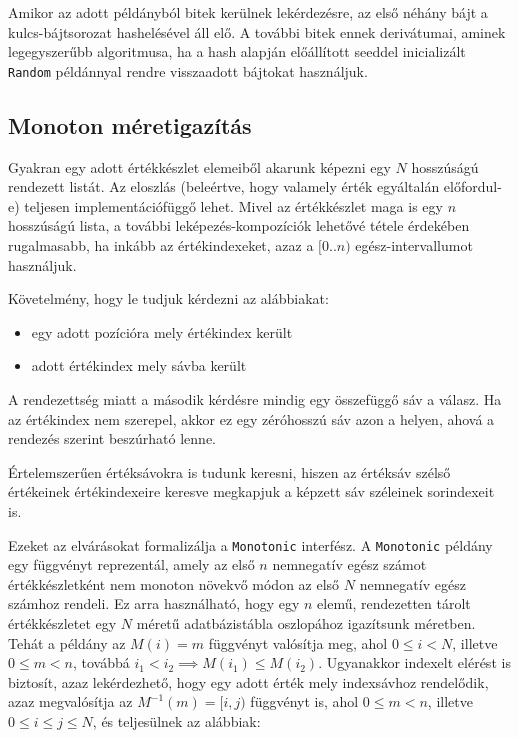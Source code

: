 \documentclass[
    parspace,
    noindent,
    nohyp,
]{elteiktdk}[2023/04/10]
\begin{document}
Amikor az adott példányból bitek kerülnek lekérdezésre,
az első néhány bájt a kulcs-bájtsorozat hashelésével áll elő.
A további bitek ennek derivátumai, aminek legegyszerűbb algoritmusa,
ha a hash alapján előállított seeddel inicializált \texttt{Random} példánnyal
rendre visszaadott bájtokat használjuk.

\subsection{Monoton méretigazítás}

Gyakran egy adott értékkészlet elemeiből akarunk képezni egy $N$ hosszúságú rendezett listát.
Az eloszlás (beleértve, hogy valamely érték egyáltalán előfordul-e)
teljesen implementációfüggő lehet.
Mivel az értékkészlet maga is egy $n$ hosszúságú lista,
a további leképezés-kompozíciók lehetővé tétele érdekében rugalmasabb,
ha inkább az értékindexeket, azaz a $[0..n)$ egész-intervallumot használjuk.

Követelmény, hogy le tudjuk kérdezni az alábbiakat:

\begin{itemize}
    \item egy adott pozícióra mely értékindex került
    \item adott értékindex mely sávba került
\end{itemize}

A rendezettség miatt a második kérdésre mindig egy összefüggő sáv a válasz. Ha az értékindex nem szerepel, akkor ez egy zéróhosszú sáv azon a helyen, ahová a rendezés szerint beszúrható lenne.

Értelemszerűen értéksávokra is tudunk keresni, hiszen az értéksáv szélső értékeinek értékindexeire keresve megkapjuk a képzett sáv széleinek sorindexeit is.

Ezeket az elvárásokat formalizálja a \texttt{Monotonic} interfész.
A \texttt{Monotonic} példány egy függvényt reprezentál,
amely az első $n$ nemnegatív egész számot értékkészletként nem monoton növekvő módon
az első $N$ nemnegatív egész számhoz rendeli.
Ez arra használható, hogy egy $n$ elemű, rendezetten tárolt értékkészletet
egy $N$ méretű adatbázistábla oszlopához igazítsunk méretben.
Tehát a példány az $M(i) = m$ függvényt valósítja meg,
ahol $0 \leq i < N$, illetve $0 \leq m < n$, továbbá $i_1 < i_2 \implies M(i_1) \leq M(i_2)$.
Ugyanakkor indexelt elérést is biztosít, azaz lekérdezhető,
hogy egy adott érték mely indexsávhoz rendelődik,
azaz megvalósítja az $M^{-1}(m) = [i, j)$ függvényt is,
ahol $0 \leq m < n$, illetve $0 \leq i \leq j \leq N$, és teljesülnek az alábbiak:
\end{document}
